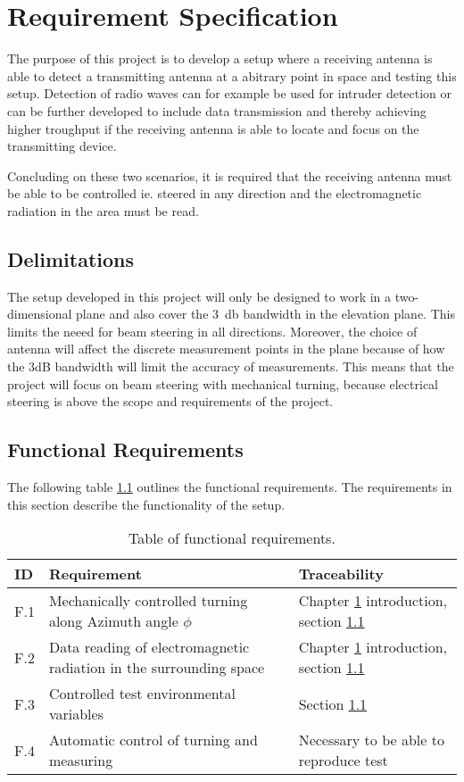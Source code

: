 \chapter{Requirement Specification} \label{ch:req}
The purpose of this project is to develop a setup where a receiving antenna is able to detect a transmitting antenna at a abitrary point in space and testing this setup. Detection of radio waves can for example be used for intruder detection or can be further developed to include data transmission and thereby achieving higher troughput if the receiving antenna is able to locate and focus on the transmitting device. 

Concluding on these two scenarios, it is required that the receiving antenna must be able to be controlled ie. steered in any direction and the electromagnetic radiation in the area must be read. 

\section{Delimitations} \label{sec:delimitations}
The setup developed in this project will only be designed to work in a two-dimensional plane and also cover the \SI{3}{\decibel} bandwidth in the elevation plane. This limits the neeed for beam steering in all directions. Moreover, the choice of antenna will affect the discrete measurement points in the plane because of how the 3dB bandwidth will limit the accuracy of measurements. This means that the project will focus on beam steering with mechanical turning, because electrical steering is above the scope and requirements of the project.

\section{Functional Requirements}
The following table \ref{tab:func_req} outlines the functional requirements. The requirements in this section describe the functionality of the setup.
\begin{table}[H]
    \centering
    \begin{tabular}{p{}|>{\raggedright}p{}|p{}}
        \textbf{ID} & \textbf{Requirement} & \textbf{Traceability} \\
        \hline
        \hline
        F.1 & Mechanically controlled turning along Azimuth angle $\phi$ & Chapter \ref{ch:req} introduction, section \ref{sec:delimitations} \\
        F.2 & Data reading of electromagnetic radiation in the surrounding space & Chapter \ref{ch:req} introduction, section \ref{sec:delimitations} \\
        F.3 & Controlled test environmental variables & Section \ref{sec:delimitations} \\
        F.4 & Automatic control of turning and measuring & Necessary to be able to reproduce test \\
    \end{tabular}
    \caption{Table of functional requirements.}
    \label{tab:func_req}
\end{table}

